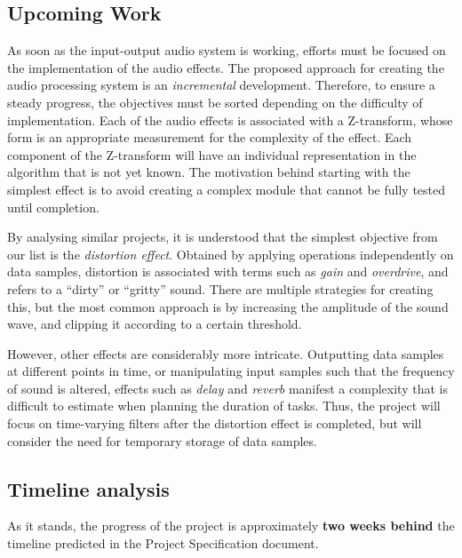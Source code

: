 \subsection{Upcoming Work}
As soon as the input-output audio system is working, efforts must be focused on the implementation of the audio effects. The proposed approach for creating the audio processing system is an \textit{incremental} development. Therefore, to ensure a steady progress, the objectives must be sorted depending on the difficulty of implementation. Each of the audio effects is associated with a Z-transform, whose form is an appropriate measurement for the complexity of the effect. Each component of the Z-transform will have an individual representation in the algorithm that is not yet known. The motivation behind starting with the simplest effect is to avoid creating a complex module that cannot be fully tested until completion. 

By analysing similar projects, it is understood that the simplest objective from our list is the \textit{distortion effect}. Obtained by applying operations independently on data samples, distortion is associated with terms such as \textit{gain} and \textit{overdrive}, and refers to a ``dirty'' or ``gritty'' sound. There are multiple strategies for creating this, but the most common approach is by increasing the amplitude of the sound wave, and clipping it according to a certain threshold.

However, other effects are considerably more intricate. Outputting data samples at different points in time, or manipulating input samples such that the frequency of sound is altered, effects such as \textit{delay} and \textit{reverb} manifest a complexity that is difficult to estimate when planning the duration of tasks. Thus, the project will focus on time-varying filters after the distortion effect is completed, but will consider the need for temporary storage of data samples.






\subsection{Timeline analysis}
As it stands, the progress of the project is approximately \textbf{two weeks behind} the timeline predicted in the Project Specification document.

